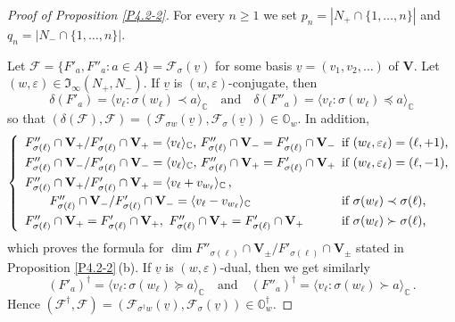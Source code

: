 \documentclass{amsart}
\theoremstyle{definition}
\begin{document}
\begin{proof}[Proof of Proposition \ref{P4.2-2}]
For every $n\geq 1$ we set $p_n=|N_+\cap\{1,\ldots,n\}|$ and $q_n=|N_-\cap\{1,\ldots,n\}|$.

Let $\mathcal{F}=\{F'_a,F''_a:a\in A\}=\mathcal{F}_\sigma(\underline{v})$ for some basis $\underline{v}=(v_1,v_2,\ldots)$ of $\mathbf{V}$.
Let $(w,\varepsilon)\in\mathfrak{I}_\infty(N_+,N_-)$.
If $\underline{v}$ is $(w,\varepsilon)$-conjugate, then
\[
\delta(F'_a)=\langle v_\ell:\sigma(w_\ell)\prec a\rangle_\mathbb{C}
\quad\mbox{and}\quad
\delta(F''_a)=\langle v_\ell:\sigma(w_\ell)\preceq a\rangle_\mathbb{C}
\]
so that $(\delta(\mathcal{F}),\mathcal{F})=(\mathcal{F}_{\sigma w}(\underline{v}),\mathcal{F}_\sigma(\underline{v}))\in\pmb{\mathbb{O}}_w$.
In addition,
\[\left\{
\begin{array}{ll}
\mbox{$F''_{\sigma(\ell)}\cap\mathbf{V}_+/F'_{\sigma(\ell)}\cap\mathbf{V}_+=\langle v_\ell\rangle_\mathbb{C}$, $F''_{\sigma(\ell)}\cap\mathbf{V}_-=F'_{\sigma(\ell)}\cap\mathbf{V}_-$} & \mbox{\!\!\!if $(w_\ell,\varepsilon_\ell)=(\ell,+1)$,} \\[1.5mm]
\mbox{$F''_{\sigma(\ell)}\cap\mathbf{V}_-/F'_{\sigma(\ell)}\cap\mathbf{V}_-=\langle v_\ell\rangle_\mathbb{C}$, $F''_{\sigma(\ell)}\cap\mathbf{V}_+=F'_{\sigma(\ell)}\cap\mathbf{V}_+$} & \mbox{\!\!\!if $(w_\ell,\varepsilon_\ell)=(\ell,-1)$,} \\[1.5mm]
\mbox{$F''_{\sigma(\ell)}\cap\mathbf{V}_+/F'_{\sigma(\ell)}\cap\mathbf{V}_+=\langle v_\ell+v_{w_\ell}\rangle_\mathbb{C}$\,,} \\[1mm]
\mbox{\qquad $F''_{\sigma(\ell)}\cap\mathbf{V}_-/F'_{\sigma(\ell)}\cap\mathbf{V}_-=\langle v_\ell- v_{w_\ell}\rangle_\mathbb{C}$} & \mbox{\!\!\!if $\sigma(w_\ell)\prec\sigma(\ell)$,} \\[1.5mm]
F''_{\sigma(\ell)}\cap \mathbf{V}_+=F'_{\sigma(\ell)}\cap \mathbf{V}_+,\ F''_{\sigma(\ell)}\cap \mathbf{V}_+=F'_{\sigma(\ell)}\cap \mathbf{V}_+ & \mbox{\!\!\!if $\sigma(w_\ell)\succ\sigma(\ell)$,}
\end{array}
\right.\]
which proves the formula for $\dim F''_{\sigma(\ell)}\cap \mathbf{V}_\pm/F'_{\sigma(\ell)}\cap \mathbf{V}_\pm$ stated in Proposition \ref{P4.2-2}\,{\rm (b)}.
If $\underline{v}$ is $(w,\varepsilon)$-dual, then we get similarly
\[
(F'_a)^\dag=\langle v_\ell:\sigma(w_\ell)\succeq a\rangle_\mathbb{C}
\quad\mbox{and}\quad
(F''_a)^\dag=\langle v_\ell:\sigma(w_\ell)\succ a\rangle_\mathbb{C}\,.
\]
Hence $(\mathcal{F}^\dag,\mathcal{F})=(\mathcal{F}_{\sigma^\dag w}(\underline{v}),\mathcal{F}_\sigma(\underline{v}))\in\pmb{\mathbb{O}}_w^\dag$.

\end{proof}
\end{document}
